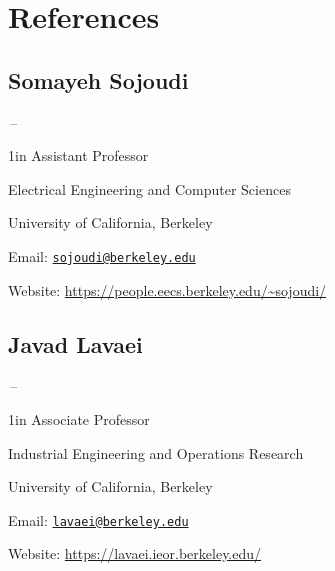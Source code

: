 \documentclass[11pt]{article}
\newcommand{\sectionwidth}{1in}		%
\newcommand{\subsectionskip}{\baselineskip}	%
\newcommand{\cvdates}[2]{\hfill#1\,--\,#2}	%
\begin{document}
	\newpage
	\section{References}

	\subsection{Somayeh Sojoudi}
	\cvdates{}{}

	\begin{adjustwidth}{\sectionwidth}{}
	Assistant Professor

	Electrical Engineering and Computer Sciences

	University of California, Berkeley
	
	Email: \href{mailto:sojoudi@berkeley.edu}{\texttt{sojoudi@berkeley.edu}}

	Website: \url{https://people.eecs.berkeley.edu/~sojoudi/}
	\end{adjustwidth}

	\vspace*{\subsectionskip}

	\subsection{Javad Lavaei}
	\cvdates{}{}

	\begin{adjustwidth}{\sectionwidth}{}
	Associate Professor

	Industrial Engineering and Operations Research

	University of California, Berkeley

	Email: \href{mailto:lavaei@berkeley.edu}{\texttt{lavaei@berkeley.edu}}

	Website: \url{https://lavaei.ieor.berkeley.edu/}
	\end{adjustwidth}
	
\end{document}
